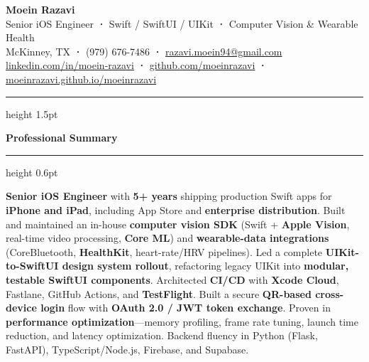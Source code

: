 \documentclass[10.5pt,letterpaper]{article}
\newcommand{\cvsection}[1]{%
  \vspace{0.2em}%
  {\color{headerblue}\large\bfseries #1}%
  \vspace{0.08em}%
  {\color{goldaccent}\hrule height 0.6pt}%
  \vspace{0.2em}%
}
\begin{document}
\begin{center}
  {\fontsize{20}{24}\selectfont\bfseries\color{headerblue}Moein Razavi}\\[0.2em]
  {\large\color{darktext}
    Senior iOS Engineer\enspace
    {\color{goldaccent}\textbf{·}}\enspace
    Swift / SwiftUI / UIKit\enspace
    {\color{goldaccent}\textbf{·}}\enspace
    Computer Vision \& Wearable Health
  }\\[0.3em]
  {\color{graytext}
    McKinney, TX\enspace
    {\color{goldaccent}\textbf{·}}\enspace
    (979) 676-7486\enspace
    {\color{goldaccent}\textbf{·}}\enspace
    \href{mailto:razavi.moein94@gmail.com}{razavi.moein94@gmail.com}
  }\\[0.15em]
  {\color{graytext}
    \href{https://linkedin.com/in/moein-razavi}{linkedin.com/in/moein-razavi}\enspace
    {\color{goldaccent}\textbf{·}}\enspace
    \href{https://github.com/moeinrazavi}{github.com/moeinrazavi}\enspace
    {\color{goldaccent}\textbf{·}}\enspace
    \href{https://moeinrazavi.github.io/moeinrazavi/}{moeinrazavi.github.io/moeinrazavi}
  }
\end{center}

\vspace{0.15em}
{\color{goldaccent}\hrule height 1.5pt}
\vspace{0.25em}

\cvsection{Professional Summary}

{\color{darktext}
\textbf{Senior iOS Engineer} with \textbf{5+ years} shipping production Swift apps for \textbf{iPhone and iPad}, including App Store and \textbf{enterprise distribution}. Built and maintained an in-house \textbf{computer vision SDK} (Swift + \textbf{Apple Vision}, real-time video processing, \textbf{Core ML}) and \textbf{wearable-data integrations} (CoreBluetooth, \textbf{HealthKit}, heart-rate/HRV pipelines). Led a complete \textbf{UIKit-to-SwiftUI design system rollout}, refactoring legacy UIKit into \textbf{modular, testable SwiftUI components}. Architected \textbf{CI/CD} with \textbf{Xcode Cloud}, Fastlane, GitHub Actions, and \textbf{TestFlight}. Built a secure \textbf{QR-based cross-device login} flow with \textbf{OAuth 2.0 / JWT token exchange}. Proven in \textbf{performance optimization}---memory profiling, frame rate tuning, launch time reduction, and latency optimization. Backend fluency in Python (Flask, FastAPI), TypeScript/Node.js, Firebase, and Supabase.
}
\end{document}
